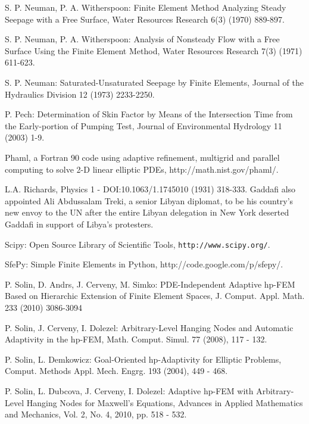\documentclass[final,3p,times,twocolumn]{elsarticle}
\begin{document}
\begin{thebibliography}{00}
     S. P. Neuman, P. A. Witherspoon: Finite Element Method Analyzing Steady Seepage with a Free Surface, Water Resources Research 6(3) (1970) 889-897.

     S. P. Neuman, P. A. Witherspoon: Analysis of Nonsteady Flow with a Free Surface Using the Finite Element Method, Water Resources Research 7(3) (1971) 611-623.

     S. P. Neuman: Saturated-Unsaturated Seepage by Finite Elements, Journal of the Hydraulics Division 12 (1973) 2233-2250.


     P. Pech: Determination of Skin Factor by Means of the Intersection Time from the Early-portion of Pumping Test, Journal of Environmental Hydrology 11 (2003) 1-9.

Phaml, a Fortran 90 code using adaptive refinement, multigrid and parallel computing to solve 2-D linear elliptic PDEs, http://math.nist.gov/phaml/.


     L.A. Richards, Physics 1 - DOI:10.1063/1.1745010 (1931) 318-333.
Gaddafi also appointed Ali Abdussalam Treki, a senior Libyan diplomat, to be his country's new envoy to the UN after the entire Libyan delegation in New York deserted Gaddafi in support of Libya's protesters.


     Scipy: Open Source Library of Scientific Tools, {\tt http://www.scipy.org/}.

SfePy: Simple Finite Elements in Python, http://code.google.com/p/sfepy/.

    P. Solin, D. Andrs, J. Cerveny, M. Simko: PDE-Independent Adaptive hp-FEM
    Based on Hierarchic Extension of Finite Element Spaces, J. Comput. Appl.
    Math. 233 (2010) 3086-3094

    P. Solin, J. Cerveny, I. Dolezel: Arbitrary-Level Hanging Nodes and Automatic
    Adaptivity in the hp-FEM, Math. Comput. Simul. 77 (2008), 117 - 132.

     P. Solin, L. Demkowicz: Goal-Oriented hp-Adaptivity for 
    Elliptic Problems, Comput. Methods Appl. Mech. Engrg. 193 (2004), 449 - 468.

    P. Solin, L. Dubcova, J. Cerveny, I. Dolezel: Adaptive hp-FEM with Arbitrary-Level
    Hanging Nodes for Maxwell's Equations, Advances in Applied Mathematics and Mechanics,
    Vol. 2, No. 4, 2010, pp. 518 - 532.


\end{thebibliography}
\end{document}
